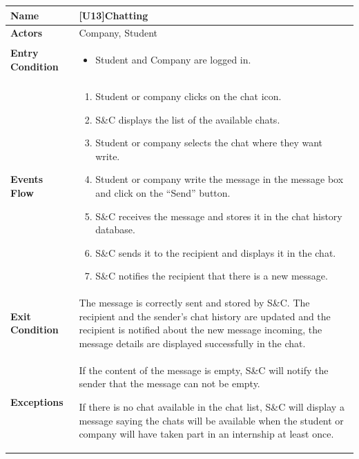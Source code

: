 \begin{center}
    \begin{tabular}{|p{9em}|p{27em}|}
        \hline
        \rowcolor{bluepoli!40} %
        \textbf{Name} & \textbf{[U13]Chatting} \\
        \hline
        \textbf{Actors} & Company, Student\\
        \hline
        \textbf{Entry Condition} & 
        \begin{itemize}
            \item Student and Company are logged in.
        \end{itemize} \\
        \hline
        \textbf{Events Flow} & 
        \begin{enumerate}
            \item Student or company clicks on the chat icon.
            \item S\&C displays the list of the available chats.
            \item Student or company selects the chat where they want write.
            \item Student or company write the message in the message box and click on the ``Send'' button.
            \item S\&C receives the message and stores it in the chat history database.
            \item S\&C sends it to the recipient and displays it in the chat.
            \item S\&C notifies the recipient that there is a new message.
        \end{enumerate} \\
        \hline
        \textbf{Exit Condition} & 
         The message is correctly sent and stored by S\&C. The recipient and the sender's chat history are updated and the recipient is
         notified about the new message incoming, the message details are displayed successfully in the chat.\\
        \hline
        \textbf{Exceptions} &
         If the content of the message is empty, S\&C will notify the sender that the message can not be empty.

         If there is no chat available in the chat list, S\&C will display a message saying the chats will be available when the student or 
         company will have taken part in an internship at least once.\\
        \hline
    \end{tabular}
\end{center}

